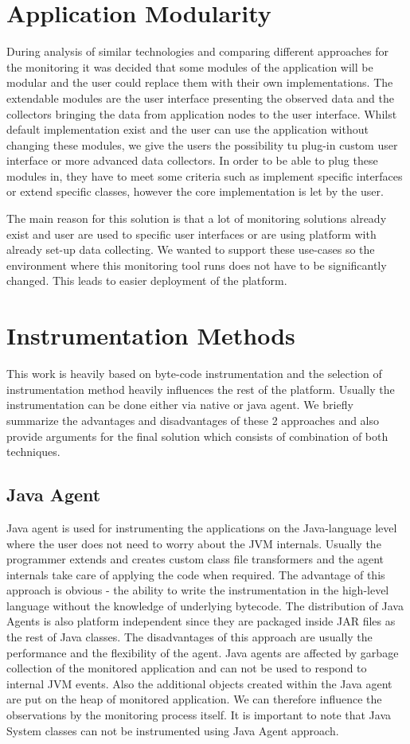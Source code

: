 \section{Application Modularity}
During analysis of similar technologies and comparing different approaches for the monitoring it was decided that some modules of the application will be modular and the user could replace them with their own implementations. The extendable modules are the user interface presenting the observed data and the collectors bringing the data from application nodes to the user interface. Whilst default implementation exist and the user can use the application without changing these modules, we give the users the possibility tu plug-in custom user interface or more advanced data collectors. In order to be able to plug these modules in, they have to meet some criteria such as implement specific interfaces or extend specific classes, however the core implementation is let by the user.

The main reason for this solution is that a lot of monitoring solutions already exist and user are used to specific user interfaces or are using platform with already set-up data collecting. We wanted to support these use-cases so the environment where this monitoring tool runs does not have to be significantly changed. This leads to easier deployment of the platform. 

\section{Instrumentation Methods}
This work is heavily based on byte-code instrumentation and the selection of instrumentation method heavily influences the rest of the platform. Usually the instrumentation can be done either via native or java agent. We briefly summarize the advantages and disadvantages of these 2 approaches and also provide arguments for the final solution which consists of combination of both techniques. 
\subsection{Java Agent}
Java agent is used for instrumenting the applications on the Java-language level where the user does not need to worry about the JVM internals. Usually the programmer extends and creates custom class file transformers and the agent internals take care of applying the code when required. The advantage of this approach is obvious - the ability to write the instrumentation in the high-level language without the knowledge of underlying bytecode. The distribution of Java Agents is also platform independent since they are packaged inside JAR files as the rest of Java classes. The disadvantages of this approach are usually the performance and the flexibility of the agent. Java agents are affected by garbage collection of the monitored application and can not be used to respond to internal JVM events. Also the additional objects created within the Java agent are put on the heap of monitored application. We can therefore influence the observations by the monitoring process itself. It is important to note that Java System classes can not be instrumented using Java Agent approach.
